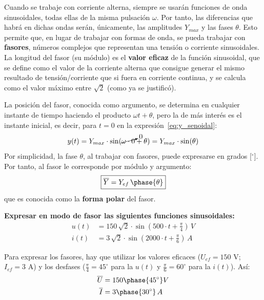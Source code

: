Cuando se trabaje con corriente alterna, siempre se usarán funciones
de onda sinusoidales, todas ellas de la misma pulsación $\omega$. Por
tanto, las diferencias que habrá en dichas ondas serán, únicamente,
las amplitudes $Y_{max}$ y las fases $\theta$. Esto permite que, en
lugar de trabajar con formas de onda, se pueda trabajar con
\textbf{fasores}, números complejos que representan una tensión o
corriente sinusoidales.  La longitud del fasor (su módulo) es el
\textbf{valor eficaz} de la función sinusoidal, que se define como el
valor de la corriente alterna que consigue generar el mismo resultado
de tensión/corriente que si fuera en corriente continua, y se calcula
como el valor máximo entre $\sqrt{2}$ (como ya se justificó).

La posición del fasor, conocida como argumento, se determina en
cualquier instante de tiempo haciendo el producto $\omega t+\theta$,
pero la de más interés es el instante inicial, es decir, para $t=0$ en
la expresión~\eqref{eq:y_senoidal}:
\begin{equation*}
  y(t)=Y_{max}\cdot\sin(\cancelto{0}{\omega \cdot 0}+\theta)=Y_{max}\cdot\sin(\theta)
\end{equation*}
Por simplicidad, la fase $\theta$, al trabajar con fasores, puede
expresarse en grados [$^\circ$]. Por tanto, al fasor le corresponde
por módulo y argumento:
\begin{equation}
  \boxed{\overline{Y}=Y_{ef}\,\phase{\theta}}
\end{equation}
que es conocida como la \textbf{forma polar} del fasor.
	
\begin{example}
  \textbf{Expresar en modo de fasor las siguientes funciones
    sinusoidales:}
  \begin{align*}
    u(t)&=150\,\sqrt{2}\cdot \sin(500\cdot t+\frac{\pi}{4})\, V\\
    i(t) &= 3\,\sqrt{2}\cdot \sin(2000\cdot t+\frac{\pi}{6})\,A
  \end{align*}
		
  Para expresar los fasores, hay que utilizar los valores eficaces
  ($U_{ef}=150$ V; $I_{ef}=3$ A) y los desfases
  ($\frac{\pi}{4}=45^\circ$ para la $u(t)$ y $\frac{\pi}{6}=60^\circ$
  para la $i(t)$). Así:
  \begin{align*}
    \overline{U}&=150\phase{45^\circ} V\\
    \overline{I}&=3\phase{30^\circ}\,A
  \end{align*}
\end{example}
	

